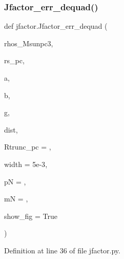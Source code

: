 \subsubsection{\texorpdfstring{Jfactor\+\_\+err\+\_\+dequad()}{Jfactor\_err\_dequad()}}
{\footnotesize\ttfamily def jfactor.\+Jfactor\+\_\+err\+\_\+dequad (\begin{DoxyParamCaption}\item[{}]{rhos\+\_\+\+Msunpc3,  }\item[{}]{rs\+\_\+pc,  }\item[{}]{a,  }\item[{}]{b,  }\item[{}]{g,  }\item[{}]{dist,  }\item[{}]{Rtrunc\+\_\+pc = {},  }\item[{}]{width = {\ttfamily 5e-\/3},  }\item[{}]{pN = {},  }\item[{}]{mN = {},  }\item[{}]{show\+\_\+fig = {\ttfamily True} }\end{DoxyParamCaption})}



Definition at line 36 of file jfactor.\+py.


